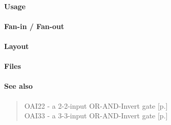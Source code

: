\paragraph{Usage}

\paragraph{Fan-in / Fan-out}

\paragraph{Layout}

\paragraph{Files}

\paragraph{See also}
\begin{quote}
    OAI22 - a 2-2-input OR-AND-Invert gate [p.\pageref{OAI22}] \\
    OAI33 - a 3-3-input OR-AND-Invert gate [p.\pageref{OAI33}]
\end{quote}
